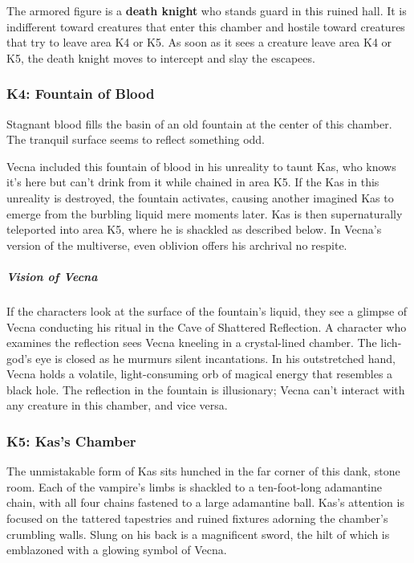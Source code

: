 \documentclass[10pt,a4paper,twoside,bg=print,twocolumn,openany,nodeprecatedcode]{dndbook}
\begin{document}
The armored figure is a \textbf{death knight} who stands guard in this ruined hall. It is indifferent toward creatures that enter this chamber and hostile toward creatures that try to leave area K4 or K5. As soon as it sees a creature leave area K4 or K5, the death knight moves to intercept and slay the escapees.

\subsubsection{K4: Fountain of Blood}
\begin{DndReadAloud}{}
Stagnant blood fills the basin of an old fountain at the center of this chamber. The tranquil surface seems to reflect something odd.

\end{DndReadAloud}

Vecna included this fountain of blood in his unreality to taunt Kas, who knows it's here but can't drink from it while chained in area K5. If the Kas in this unreality is destroyed, the fountain activates, causing another imagined Kas to emerge from the burbling liquid mere moments later. Kas is then supernaturally teleported into area K5, where he is shackled as described below. In Vecna's version of the multiverse, even oblivion offers his archrival no respite.

\subparagraph{Vision of Vecna}
If the characters look at the surface of the fountain's liquid, they see a glimpse of Vecna conducting his ritual in the Cave of Shattered Reflection. A character who examines the reflection sees Vecna kneeling in a crystal-lined chamber. The lich-god's eye is closed as he murmurs silent incantations. In his outstretched hand, Vecna holds a volatile, light-consuming orb of magical energy that resembles a black hole. The reflection in the fountain is illusionary; Vecna can't interact with any creature in this chamber, and vice versa.

\subsubsection{K5: Kas's Chamber}
\begin{DndReadAloud}{}
The unmistakable form of Kas sits hunched in the far corner of this dank, stone room. Each of the vampire's limbs is shackled to a ten-foot-long adamantine chain, with all four chains fastened to a large adamantine ball. Kas's attention is focused on the tattered tapestries and ruined fixtures adorning the chamber's crumbling walls. Slung on his back is a magnificent sword, the hilt of which is emblazoned with a glowing symbol of Vecna.

\end{DndReadAloud}
\end{document}
